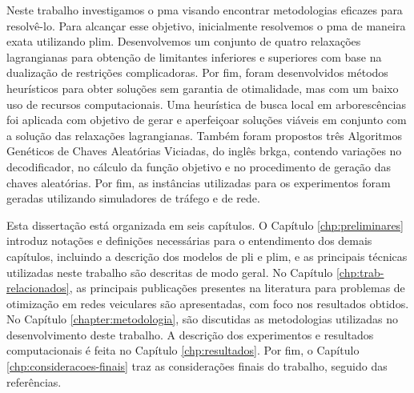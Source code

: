 Neste trabalho investigamos o \gls{pma} visando encontrar metodologias
eficazes para  resolvê-lo.  Para alcançar esse  objetivo, inicialmente
resolvemos  o  \gls{pma}  de   maneira  exata  utilizando  \gls{plim}.
Desenvolvemos  um  conjunto  de quatro  relaxações  lagrangianas  para
obtenção de limitantes inferiores e  superiores com base na dualização
de  restrições complicadoras.   Por fim,  foram desenvolvidos  métodos
heurísticos para obter  soluções sem garantia de  otimalidade, mas com
um  baixo uso  de recursos  computacionais.  Uma  heurística de  busca
local  em  arborescências  foi  aplicada   com  objetivo  de  gerar  e
aperfeiçoar soluções viáveis em conjunto  com a solução das relaxações
lagrangianas.   Também foram  propostos três  Algoritmos Genéticos  de
Chaves Aleatórias Viciadas, do  inglês \gls{brkga}, contendo variações
no decodificador, no  cálculo da função objetivo e  no procedimento de
geração das chaves aleatórias.  Por fim, as instâncias utilizadas para
os experimentos foram  geradas utilizando simuladores de  tráfego e de
rede.

Esta  dissertação  está  organizada  em seis  capítulos.   O  Capítulo
\eqref{chp:preliminares}  introduz notações  e definições  necessárias
para o  entendimento dos demais  capítulos, incluindo a  descrição dos
modelos de \gls{pli} e \gls{plim}, e as principais técnicas utilizadas
neste   trabalho   são  descritas   de   modo   geral.   No   Capítulo
\ref{chp:trab-relacionados},  as principais  publicações presentes  na
literatura  para  problemas  de  otimização em  redes  veiculares  são
apresentadas,   com  foco   nos  resultados   obtidos.   No   Capítulo
\ref{chapter:metodologia}, são  discutidas as  metodologias utilizadas
no  desenvolvimento deste  trabalho.  A  descrição dos  experimentos e
resultados  computacionais é  feita no  Capítulo \ref{chp:resultados}.
Por   fim,   o   Capítulo   \ref{chp:consideracoes-finais}   traz   as
considerações finais do trabalho, seguido das referências.

